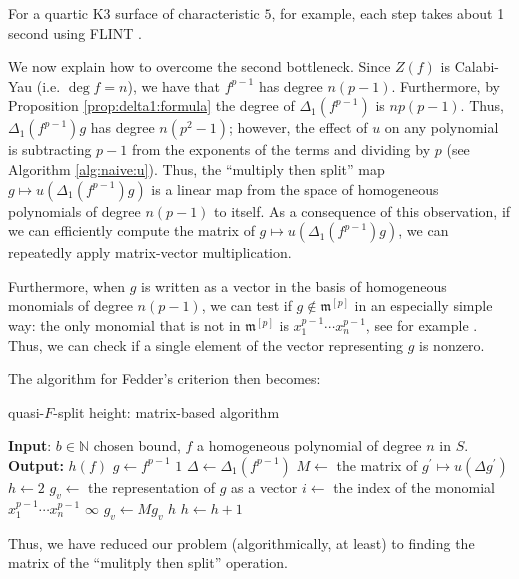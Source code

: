 \noindent For a quartic K3 surface of characteristic \(5\),
for example, each step takes about 1 second 
using FLINT \cite{flint-2023-flint}. 

We now explain how to overcome the second
bottleneck. Since \(Z(f)\) is Calabi-Yau
(i.e. \(\deg f = n\)), we have that \(f^{p-1}\) has degree
\(n(p-1)\). 
Furthermore, by Proposition \ref{prop:delta1:formula}
the degree of \(\Delta_{1}(f^{p-1})\) 
is \(np(p - 1)\).
Thus, \(\Delta_{1}(f^{p-1})g\) has degree
\(n(p^{2} - 1)\); however, the effect 
of \(u\) on any polynomial is subtracting \(p-1\)
from the exponents of the terms and dividing by \(p\) 
(see Algorithm \ref{alg:naive:u}).
Thus, the ``multiply then split'' map 
\(g \mapsto u(\Delta_{1}(f^{p-1}) g)\) 
is a linear map from 
the space of homogeneous polynomials of degree \(n(p-1)\) 
to itself.
As a consequence of this observation,
if we can efficiently compute the matrix of 
\(g \mapsto u(\Delta_{1}(f^{p-1})g)\),
we can repeatedly apply matrix-vector multiplication.

Furthermore, when \(g\) is written as a vector 
in the basis of homogeneous monomials of degree
\(n(p-1)\), we can test if \(g \notin \mathfrak{m}^{[p]}\) 
in an especially simple way: the only 
monomial that is not in \(\mathfrak{m}^{[p]}\) is
\(x_{1}^{p-1}\cdots x_{n}^{p-1}\), 
see for example \cite{kty-2022-fedder}.
Thus, we can check if a single element of the vector representing
\(g\) is nonzero.

The algorithm for Fedder's criterion then becomes:

\begin{algorithm}[H]
\caption{quasi-\(F\)-split height: matrix-based algorithm}
\label{alg:qfs:matrix}
\begin{algorithmic}[1]
\State \textbf{Input}: \(b \in \mathbb{N}\) chosen bound, \(f\) a homogeneous
	polynomial of degree \(n\) in \(S\).
\State \textbf{Output:} $h(f)$
\State \(g \gets f^{p-1}\) 
    \State \Return \(1\) 
\EndIf
\State \(\Delta \gets \Delta_{1}(f^{p-1})\) 
\State \(M \gets\) the matrix of  \(g^{\prime} \mapsto u(\Delta g^{\prime})\)
\State \(h \gets 2\) 
\State \(g_{v} \gets\) the representation of \(g\) as a vector
\State \(i \gets \) the index of the monomial \(x_{1}^{p-1}\cdots x_{n}^{p-1}\)
        \State \Return \(\infty\)
    \EndIf
    \State \(g_{v} \gets M g_{v}\) 
        \State \Return \(h\) 
    \EndIf
    \State \(h \gets h + 1\)
\EndWhile
\end{algorithmic}
\end{algorithm}

Thus, we have reduced our problem (algorithmically, at least)
to finding the matrix of the ``mulitply then split'' operation.
